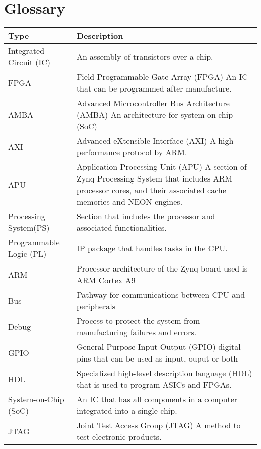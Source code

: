 \section{Glossary}
\begin{table}[H]
		\centering
		\begin{tabularx}{\textwidth}{|p{2.2cm}  |X|}
			\hline
			\textbf{Type} & \textbf{Description} \\
			\hline\hline
            Integrated Circuit (IC) & An assembly of transistors over a chip.\\
            \hline
            FPGA & Field Programmable Gate Array (FPGA) An IC that can be programmed after manufacture.\\
            \hline
			AMBA & Advanced Microcontroller Bus Architecture (AMBA) An architecture for system-on-chip (SoC) \\
			\hline
            AXI & Advanced eXtensible Interface (AXI) A high-performance protocol by ARM.\\
            \hline
			APU & Application Processing Unit (APU) A section of Zynq Processing System that includes ARM processor cores, and their associated cache memories and NEON engines. \\
            \hline
            Processing System(PS) & Section that includes the processor and associated functionalities.\\
			\hline
            Programmable Logic (PL) & IP package that handles tasks in the CPU.\\
            \hline
			ARM & Processor architecture of the Zynq board used is ARM Cortex A9 \\
			\hline
			Bus & Pathway for communications between CPU and peripherals \\
            \hline
			Debug & Process to protect the system from manufacturing failures and errors. \\
            \hline
			GPIO & General Purpose Input Output (GPIO) digital pins that can be used as input, ouput or both \\
            \hline
            HDL & Specialized high-level description language (HDL) that is used to program ASICs and FPGAs.\\
            \hline
			System-on-Chip (SoC) &  An IC that has all components in a computer integrated into a single chip. \\
			\hline
            JTAG & Joint Test Access Group (JTAG) A method to test electronic products.\\

\end{tabularx}
\end{table}
